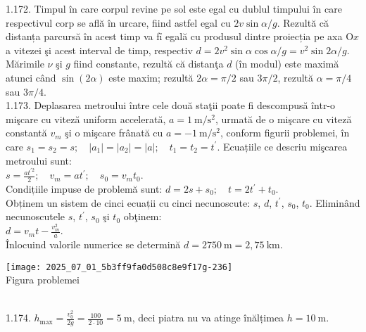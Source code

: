 1.172. Timpul în care corpul revine pe sol este egal cu dublul timpului în care respectivul corp se află în urcare, fiind astfel egal cu $2 v \sin \alpha / g$. Rezultă că distanța parcursă în acest timp va fỉ egală cu produsul dintre proiecția pe axa $\mathrm{O} x$ a vitezei şi acest interval de timp, respectiv $d=2 v^{2} \sin \alpha \cos \alpha / g=v^{2} \sin 2 \alpha / g$. Mărimile $\nu$ şi $g$ fiind constante, rezultă că distanţa $d$ (în modul) este maximă atunci când $\sin (2 \alpha)$ este maxim; rezultă $2 \alpha=\pi / 2$ sau $3 \pi / 2$, rezultă $\alpha=\pi / 4$ sau $3 \pi / 4$.\\

1.173. Deplasarea metroului între cele două staţii poate fi descompusă într-o mişcare cu viteză uniform accelerată, $a=1 \mathrm{~m} / \mathrm{s}^{2}$, urmată de o mişcare cu viteză constantă $v_{m}$ şi o mişcare frânată cu $a=-1 \mathrm{~m} / \mathrm{s}^{2}$, conform figurii problemei, în care $s_{1}=s_{2}=s; \quad \left|a_{1}\right|=\left|a_{2}\right|=|a|; \quad t_{1}=t_{2}=t^{\prime}$. Ecuațiile ce descriu mişcarea metroului sunt:\\ $s=\frac{a t^{\prime 2}}{2}; \quad v_{m}=a t^{\prime}; \quad s_{0}=v_{m} t_{0}$.\\ Condițiile impuse de problemă sunt: $d=2 s+s_{0}; \quad t=2 t^{\prime}+t_{0}$.\\ Obținem un sistem de cinci ecuații cu cinci necunoscute: $s$, $d$, $t^{\prime}$, $s_{0}$, $t_{0}$. Eliminând necunoscutele $s$, $t^{\prime}$, $s_{0}$ şi $t_{0}$ obţinem:\\ $d=v_{m} t-\frac{v_{m}^{2}}{a}$.\\ Înlocuind valorile numerice se determină $d=2750 \mathrm{~m}=2,75 \mathrm{~km}$.\\ \begin{center} \texttt{[image: 2025\_07\_01\_5b3ff9fa0d508c8e9f17g-236]}\\ Figura problemei \end{center}\\

1.174. $h_{\max }=\frac{v_{0}^{2}}{2 g}=\frac{100}{2 \cdot 10}=5 \mathrm{~m}$, deci piatra nu va atinge înălțimea $h=10 \mathrm{~m}$.\\

